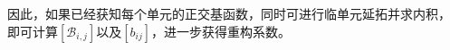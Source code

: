\documentclass[UTF8,zihao=5]{ctexart} %
\begin{document}
因此，如果已经获知每个单元的正交基函数，同时可进行临单元延拓并求内积，
即可计算$[\mathcal{B}_{i,j}]$以及$[b_{ij}]$，进一步获得重构系数。







{}






























\end{document}
